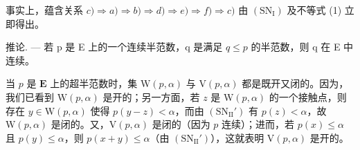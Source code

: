 事实上，蕴含关系 \(c) \Rightarrow a) \Rightarrow b) \Rightarrow d) \Rightarrow e) \Rightarrow f) \Rightarrow c)\) 由 \((\mathrm{SN}_{\mathrm{I}})\) 及不等式 (1) 立即得出。

推论. --- 若 p 是 E 上的一个连续半范数，q 是满足 \(q \leqslant p\) 的半范数，则 q 在 E 中连续。

当 \(p\) 是 \(\mathbf{E}\) 上的超半范数时，集 \(\mathrm{W}(p, \alpha)\) 与 \(\mathrm{V}(p, \alpha)\) 都是既开又闭的。因为，我们已看到 \(\mathrm{W}(p, \alpha)\) 是开的；另一方面，若 \(z\) 是 \(\mathrm{W}(p, \alpha)\) 的一个接触点，则存在 \(y \in \mathrm{W}(p, \alpha)\) 使得 \(p(y - z) < \alpha\)，而由 \((\mathrm{SN}_{\mathrm{II}}')\) 有 \(p(z) < \alpha\)，故 \(\mathrm{W}(p, \alpha)\) 是闭的。又，\(\mathrm{V}(p, \alpha)\) 是闭的（因为 \(p\) 连续）；进而，若 \(p(x) \leqslant \alpha\) 且 \(p(y) \leqslant \alpha\)，则 \(p(x + y) \leqslant \alpha\)（由 \((\mathrm{SN}_{\mathrm{II}}')\)），这就表明 \(\mathrm{V}(p, \alpha)\) 是开的。

